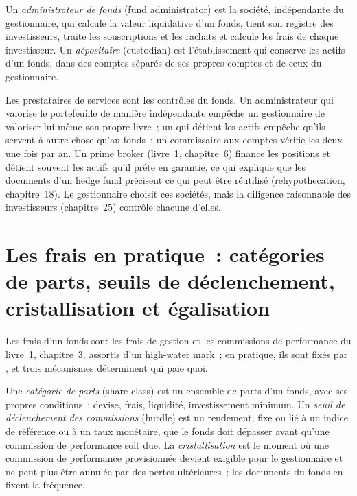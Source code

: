 \begin{definition}\label{def:fm:the-asset-manager-and-the-fund:admin}
Un \emph{administrateur de fonds} (fund administrator) est la société, indépendante du gestionnaire, qui calcule la valeur liquidative d'un fonds, tient
son registre des investisseurs, traite les souscriptions et les rachats et calcule les frais de chaque investisseur. Un \emph{dépositaire} (custodian) est
l'établissement qui conserve les actifs d'un fonds, dans des comptes séparés de ses propres comptes et de ceux du gestionnaire.
\end{definition}

Les prestataires de services sont les contrôles du fonds. Un administrateur qui valorise le portefeuille de manière indépendante empêche un gestionnaire de valoriser lui-même son propre livre~; un
 qui détient les actifs empêche qu'ils servent à autre chose qu'au fonds~; un commissaire aux comptes vérifie les deux une fois par an. Un prime broker (livre~1, chapitre~6)
finance les positions et détient souvent les actifs qu'il prête en garantie, ce qui explique que les documents d'un hedge fund précisent ce qui peut être
réutilisé (rehypothecation, chapitre~18). Le gestionnaire choisit ces sociétés, mais la diligence raisonnable des investisseurs (chapitre~25) contrôle chacune d'elles.

\section{Les frais en pratique~: catégories de parts, seuils de déclenchement, cristallisation et égalisation}

Les frais d'un fonds sont les frais de gestion et les commissions de performance du livre~1, chapitre~3, assortis d'un high-water mark~; en pratique, ils sont fixés par ,
et trois mécanismes déterminent qui paie quoi.

\begin{definition}\label{def:fm:the-asset-manager-and-the-fund:class}
Une \emph{catégorie de parts} (share class) est un ensemble de parts d'un fonds, avec ses propres conditions~: devise, frais, liquidité, investissement minimum. Un
\emph{seuil de déclenchement des commissions} (hurdle) est un rendement, fixe ou lié à un indice de référence ou à un taux monétaire, que le fonds doit dépasser avant qu'une commission de performance
soit due. La \emph{cristallisation} est le moment où une commission de performance provisionnée devient exigible pour le gestionnaire et ne peut plus
être annulée par des pertes ultérieures~; les documents du fonds en fixent la fréquence.
\end{definition}

